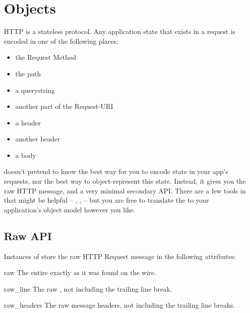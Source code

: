 \section{ Objects \label{request}}

HTTP is a stateless protocol. Any application state that exists in a request is
encoded in one of the following places:

\begin{itemize}
\item{the Request Method}
\item{the path}
\item{a querystring}
\item{another part of the Request-URI}
\item{a  header}
\item{another header}
\item{a  body}
\end{itemize}

 doesn't pretend to know the best way for you to encode state in
your app's requests, nor the best way to object-represent this state. Instead,
it gives you the raw HTTP message, and a very minimal secondary API. There are a
few tools in  that might be helpful -- ,
,  -- but you are free to translate
the  to your application's object model however you like.


\subsection{Raw API}

Instances of  store the raw HTTP Request message in the
following attributes:

\begin{datadesc}{raw}
The entire  exactly as it was found on the wire.
\end{datadesc}

\begin{datadesc}{raw_line}
The raw
,
 not including the trailing line break.
\end{datadesc}

\begin{datadesc}{raw_headers}
The raw message headers, not including the trailing line breaks.
\end{datadesc}

